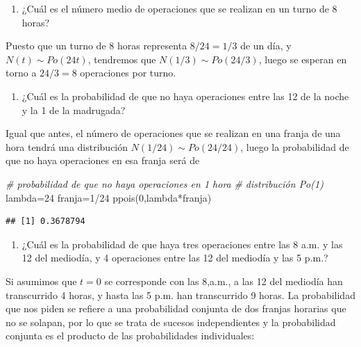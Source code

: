 \documentclass[
]{book}
\newenvironment{Shaded}{\begin{snugshade}}{\end{snugshade}}
\newcommand{\CommentTok}[1]{\textcolor[rgb]{0.56,0.35,0.01}{\textit{#1}}}
\newcommand{\DecValTok}[1]{\textcolor[rgb]{0.00,0.00,0.81}{#1}}
\newcommand{\FunctionTok}[1]{\textcolor[rgb]{0.00,0.00,0.00}{#1}}
\newcommand{\NormalTok}[1]{#1}
\newcommand{\OtherTok}[1]{\textcolor[rgb]{0.56,0.35,0.01}{#1}}
\newcommand{\SpecialCharTok}[1]{\textcolor[rgb]{0.00,0.00,0.00}{#1}}
\providecommand{\tightlist}{%
  \setlength{\itemsep}{0pt}\setlength{\parskip}{0pt}}
\theoremstyle{definition}
\theoremstyle{definition}
\theoremstyle{definition}
\theoremstyle{definition}
\theoremstyle{remark}
\begin{document}
\begin{enumerate}
\def\labelenumi{\arabic{enumi}.}
\tightlist
\item
  ¿Cuál es el número medio de operaciones que se realizan en un turno de 8 horas?
\end{enumerate}

Puesto que un turno de 8 horas representa \(8/24=1/3\) de un día, y \(N(t)\sim Po(24t)\), tendremos que \(N(1/3)\sim Po(24/3)\), luego se esperan en torno a \(24/3=8\) operaciones por turno.

\begin{enumerate}
\def\labelenumi{\arabic{enumi}.}
\setcounter{enumi}{1}
\tightlist
\item
  ¿Cuál es la probabilidad de que no haya operaciones entre las 12 de la noche y la 1 de la madrugada?
\end{enumerate}

Igual que antes, el número de operaciones que se realizan en una franja de una hora tendrá una distribución \(N(1/24) \sim Po(24/24)\), luego la probabilidad de que no haya operaciones en esa franja será de

\begin{Shaded}
\begin{Highlighting}[]
\CommentTok{\# probabilidad de que no haya operaciones en 1 hora}
\CommentTok{\# distribución Po(1)}
\NormalTok{lambda}\OtherTok{=}\DecValTok{24}
\NormalTok{franja}\OtherTok{=}\DecValTok{1}\SpecialCharTok{/}\DecValTok{24}
\FunctionTok{ppois}\NormalTok{(}\DecValTok{0}\NormalTok{,lambda}\SpecialCharTok{*}\NormalTok{franja)}
\end{Highlighting}
\end{Shaded}

\begin{verbatim}
## [1] 0.3678794
\end{verbatim}

\begin{enumerate}
\def\labelenumi{\arabic{enumi}.}
\setcounter{enumi}{2}
\tightlist
\item
  ¿Cuál es la probabilidad de que haya tres operaciones entre las 8 a.m. y las 12 del mediodía, y 4 operaciones entre las 12 del mediodía y las 5 p.m.?
\end{enumerate}

Si asumimos que \(t=0\) se corresponde con las 8,a.m., a las 12 del mediodía han transcurrido 4 horas, y hasta las 5 p.m. han transcurrido 9 horas. La probabilidad que nos piden se refiere a una probabilidad conjunta de dos franjas horarias que no se solapan, por lo que se trata de sucesos independientes y la probabilidad conjunta es el producto de las probabilidades individuales:
\end{document}
